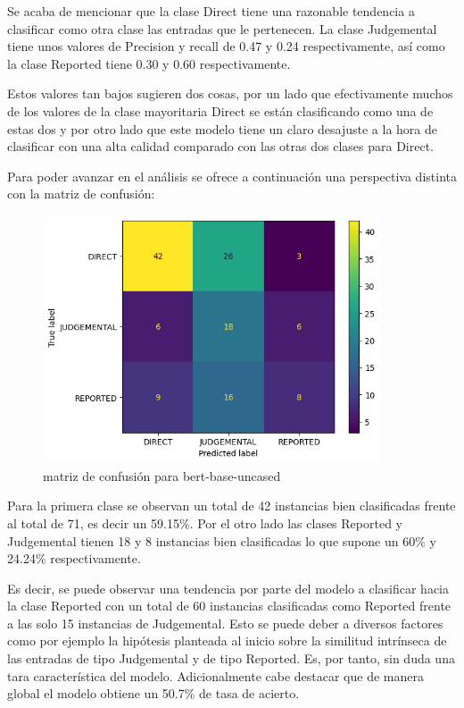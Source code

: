 Se acaba de mencionar que la clase Direct tiene una razonable tendencia a clasificar como otra clase las entradas que le pertenecen. La clase Judgemental tiene unos valores de Precision y recall de 0.47 y 0.24 respectivamente, así como la clase Reported tiene 0.30 y 0.60 respectivamente. 

Estos valores tan bajos sugieren dos cosas, por un lado que efectivamente muchos de los valores de la clase mayoritaria Direct se están clasificando como una de estas dos y por otro lado que este modelo tiene un claro desajuste a la hora de clasificar con una alta calidad comparado con las otras dos clases para Direct.

Para poder avanzar en el análisis se ofrece a continuación una perspectiva distinta con la matriz de confusión:

\begin{figure}[H]
    \centering
    \includegraphics[width=10cm]{imagenes/Evaluacion/confusion_matrix/bert_base-uncased-english-dirty_task2.png}
    \caption{\centering matriz de confusión para bert-base-uncased}
\end{figure}

Para la primera clase se observan un total de 42 instancias bien clasificadas frente al total de 71, es decir un 59.15\%. Por el otro lado las clases Reported y Judgemental tienen 18 y 8 instancias bien clasificadas lo que supone un 60\% y 24.24\% respectivamente. 

Es decir, se puede observar una tendencia por parte del modelo a clasificar hacia la clase Reported con un total de 60 instancias clasificadas como Reported frente a las solo 15 instancias de Judgemental. Esto se puede deber a diversos factores como por ejemplo la hipótesis planteada al inicio sobre la similitud intrínseca de las entradas de tipo Judgemental y de tipo Reported. Es, por tanto, sin duda una tara característica del modelo. Adicionalmente cabe destacar que de manera global el modelo obtiene un 50.7\% de tasa de acierto.


